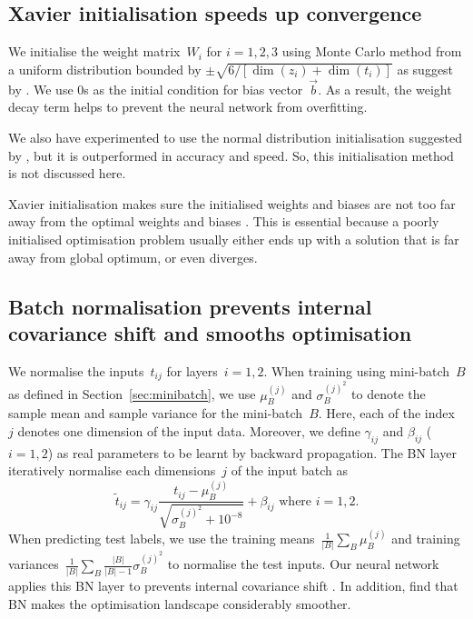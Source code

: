 \subsection{Xavier initialisation speeds up convergence\label{sec:xav}}
We initialise the weight matrix~$W_i$ for $i=1,2,3$ using Monte Carlo method from a uniform distribution bounded by $\pm \sqrt{6/\left[\dim(z_i)+\dim(t_i)\right]}$ as suggest by \citet{pmlr-v9-glorot10a}. We use $0$s as the initial condition for bias vector~$\vec b$. As a result, the weight decay term helps to prevent the neural network from overfitting.

We also have experimented to use the normal distribution initialisation suggested by \citet{pmlr-v9-glorot10a}, but it is outperformed in accuracy and speed. So, this initialisation method is not discussed here.

Xavier initialisation makes sure the initialised weights and biases are not too far away from the optimal weights and biases \citep{pmlr-v9-glorot10a}. This is essential because a poorly initialised optimisation problem usually either ends up with a solution that is far away from global optimum, or even diverges.

\subsection{Batch normalisation prevents internal covariance shift and smooths optimisation}
We normalise the inputs~$t_{ij}$ for layers~$i=1,2$. When training using mini-batch~$B$ as defined in Section~\ref{sec:minibatch}, we use $\mu_B^{(j)}$ and $\sigma_B^{(j)^2}$ to denote the sample mean and sample variance for the mini-batch~$B$. Here, each of the index~$j$ denotes one dimension of the input data. Moreover, we define $\gamma_{ij}$ and $\beta_{ij}$ ($i=1,2$) as real parameters to be learnt by backward propagation. The BN layer iteratively normalise each dimensions~$j$ of the input batch as
\begin{equation}
     {\tilde {t}}_{ij}=\gamma_{ij}\frac {{t}_{ij}-\mu _{B}^{(j)}}{\sqrt {\sigma _{B}^{(j)^{2}}+10^{-8} }}+\beta_{ij} \text{ where } i=1,2.
\end{equation}
When predicting test labels, we use the training means~$\frac{1}{\left|B\right|}\sum_B \mu_B^{(j)}$ and training  variances~$\frac{1}{\left|B\right|}\sum_B \frac{\left|B\right|}{\left|B\right|-1}\sigma_B^{(j)^2}$ to normalise the test inputs.
Our neural network applies this BN layer to prevents internal covariance shift \citep{pmlr-v37-ioffe15}. In addition, \citet{NIPS20187515} find that BN makes the optimisation landscape considerably smoother.

